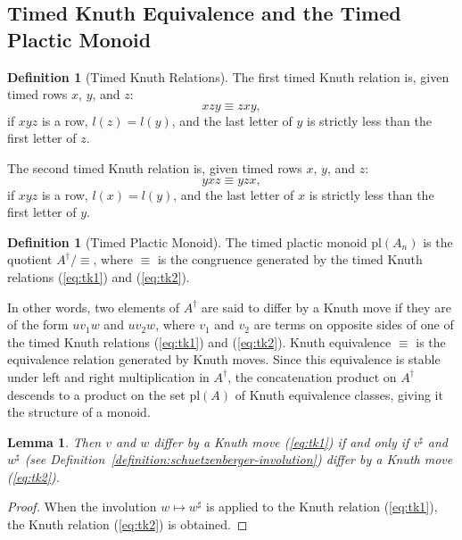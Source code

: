 \documentclass[10pt]{amsproc}
\newtheorem{lemma}[theorem]{Lemma}
\theoremstyle{definition}
\newtheorem{definition}[theorem]{Definition}
\theoremstyle{remark}
\newcommand{\pl}{\mathrm{pl}}
\begin{document}
\subsection{Timed Knuth Equivalence and the Timed Plactic Monoid}
\begin{definition}
  [Timed Knuth Relations]
  \label{sec:timed-knuth-equiv}
  The first timed Knuth relation is, given timed rows $x$, $y$, and $z$:
  \begin{equation}
    \tag{$\kappa_1$}
    \label{eq:tk1}
    xzy \equiv zxy,
  \end{equation}
  if $xyz$ is a row, $l(z) = l(y)$, and the last letter of $y$ is strictly less than the first letter of $z$.

  The second timed Knuth relation is, given timed rows $x$, $y$, and $z$:
  \begin{equation}
    \tag{$\kappa_2$}
    \label{eq:tk2}
    yxz \equiv yzx,
  \end{equation}
  if $xyz$ is a row, $l(x)=l(y)$, and the last letter of $x$ is strictly less than the first letter of $y$.
\end{definition}
\begin{definition}
  [Timed Plactic Monoid]
  \label{definition:timed-plactic-monoid}
  The timed plactic monoid $\pl(A_n)$ is the quotient $A^\dagger/\equiv$, where $\equiv$ is the congruence generated by the timed Knuth relations (\ref{eq:tk1}) and (\ref{eq:tk2}).
\end{definition}
In other words, two elements of $A^\dagger$ are said to differ by a Knuth move if they are of the form $uv_1w$ and $uv_2w$, where $v_1$ and $v_2$ are terms on opposite sides of one of the timed Knuth relations (\ref{eq:tk1}) and (\ref{eq:tk2}).
Knuth equivalence $\equiv$ is the equivalence relation generated by Knuth moves.
Since this equivalence is stable under left and right multiplication in $A^\dagger$, the concatenation product on $A^\dagger$ descends to a product on the set $\pl(A)$ of Knuth equivalence classes, giving it the structure of a monoid.
\begin{lemma}
  \label{lemma:sharp-moves}
  Then $v$ and $w$ differ by a Knuth move (\ref{eq:tk1}) if and only if $v^\sharp$ and $w^\sharp$ (see Definition~\ref{definition:schuetzenberger-involution}) differ by a Knuth move (\ref{eq:tk2}).
\end{lemma}
\begin{proof}
  When the involution $w\mapsto w^\sharp$ is applied to the Knuth relation (\ref{eq:tk1}), the Knuth relation (\ref{eq:tk2}) is obtained.
\end{proof}
\end{document}
